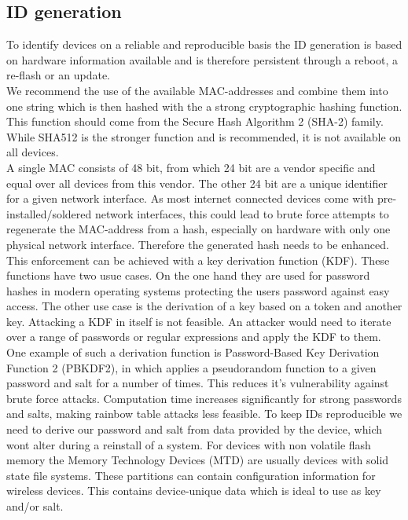     \subsection{ID generation}
        \label{subsec:software_design:id}
        To identify devices on a reliable and reproducible basis the ID generation is based on hardware information available and is therefore persistent through a reboot, a re-flash or an update.\\
        We recommend the use of the available MAC-addresses and combine them into one string which is then hashed with the a strong cryptographic hashing function.
        This function should come from the Secure Hash Algorithm 2 (SHA-2) family. While SHA512 is the stronger function and is recommended, it is not available on all devices.\\
        A single MAC consists of 48 bit, from which 24 bit are a vendor specific and equal over all devices from this vendor. The other 24 bit are a unique identifier for a given network interface. As most internet connected devices come with pre-installed/soldered network interfaces, this could lead to brute force attempts to regenerate the MAC-address from a hash, especially on hardware with only one physical network interface. Therefore the generated hash needs to be enhanced.\\
        This enforcement can be achieved with a key derivation function (KDF). These functions have two usue cases. On the one hand they are used for password hashes in modern operating systems protecting the users password against easy access\cite{percival_stronger_nodate}. 
        The other use case is the derivation of a key based on a token and another key\cite{camenisch_privacy_2011}. Attacking a KDF in itself is not feasible. An attacker would need to iterate over a range of passwords or regular expressions and apply the KDF to them\cite{percival_stronger_nodate}.
        One example of such a derivation function is Password-Based Key Derivation Function 2 (PBKDF2), in which applies a pseudorandom function to a given password and salt for a number of times. This reduces it's vulnerability against brute force attacks\cite{kaliski_bkaliskirsasecuritycom_pkcs_2000}. 
        Computation time increases significantly for strong passwords and salts, making rainbow table attacks less feasible. 
        To keep IDs reproducible we need to derive our password and salt from data provided by the device, which wont alter during a reinstall of a system. For devices with non volatile flash memory the Memory Technology Devices (MTD) are usually devices with solid state file systems\cite{giometti_mtd_2017}. These partitions can contain configuration information for wireless devices. This contains device-unique data which is ideal to use as key and/or salt.
        
